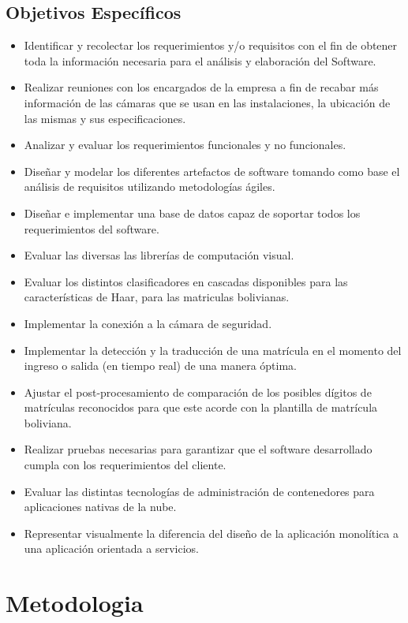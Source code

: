     \subsection{Objetivos Específicos}
    \begin{itemize}
    \item Identificar y recolectar los requerimientos y/o requisitos con el fin de obtener toda la información necesaria para el análisis y elaboración del Software.
    \item Realizar reuniones con los encargados de la empresa a fin de recabar más información de las cámaras que se usan en las instalaciones, la ubicación de las mismas y sus especificaciones.
    \item Analizar y evaluar los requerimientos funcionales y no funcionales.
    \item Diseñar y modelar los diferentes artefactos de software tomando como base el análisis de requisitos utilizando metodologías ágiles.
    \item Diseñar e implementar una base de datos capaz de soportar todos los requerimientos del software.
    \item Evaluar las diversas las librerías de computación visual.
    \item Evaluar los distintos clasificadores en cascadas disponibles para las características de Haar, para las matriculas bolivianas.
    \item Implementar la conexión a la cámara de seguridad.
    \item Implementar la detección y la traducción de una matrícula en el momento del ingreso o salida (en tiempo real) de una manera óptima.
    \item Ajustar el post-procesamiento de comparación de los posibles dígitos de matrículas reconocidos para que este acorde con la plantilla de matrícula boliviana.
    \item Realizar pruebas necesarias para garantizar que el software desarrollado cumpla con los requerimientos del cliente.
    \item Evaluar las distintas tecnologías de administración de contenedores para aplicaciones nativas de la nube. 
    \item Representar visualmente la diferencia del diseño de la aplicación monolítica a una aplicación orientada a servicios.
    

    \end{itemize}
\section{Metodologia}

